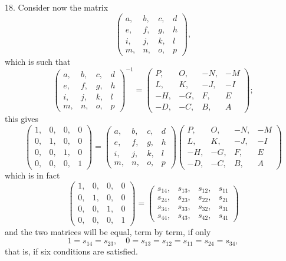 \documentclass[11pt,a4paper]{article}
\theoremstyle{plain}
\begin{document}
18. Consider now the matrix
\[
\begin{pmatrix}
a, & b, & c, & d \\
e, & f, & g, & h \\
i, & j, & k, & l \\
m, & n, & o, & p
\end{pmatrix},
\]
which is such that
\[
\begin{pmatrix}
a, & b, & c, & d \\
e, & f, & g, & h \\
i, & j, & k, & l \\
m, & n, & o, & p
\end{pmatrix}^{-1}
=
\begin{pmatrix}
P, & O, & -N, & -M \\
L, & K, & -J, & -I \\
-H, & -G, & F, & E \\
-D, & -C, & B, & A
\end{pmatrix};
\]
this gives
\[
\begin{pmatrix}
1, & 0, & 0, & 0 \\
0, & 1, & 0, & 0 \\
0, & 0, & 1, & 0 \\
0, & 0, & 0, & 1
\end{pmatrix}
=
\begin{pmatrix}
a, & b, & c, & d \\
e, & f, & g, & h \\
i, & j, & k, & l \\
m, & n, & o, & p
\end{pmatrix}
\begin{pmatrix}
P, & O, & -N, & -M \\
L, & K, & -J, & -I \\
-H, & -G, & F, & E \\
-D, & -C, & B, & A
\end{pmatrix}
\]
which is in fact
\[
\begin{pmatrix}
1, & 0, & 0, & 0 \\
0, & 1, & 0, & 0 \\
0, & 0, & 1, & 0 \\
0, & 0, & 0, & 1
\end{pmatrix}
=
\begin{pmatrix}
s_{14}, & s_{13}, & s_{12}, & s_{11} \\
s_{24}, & s_{23}, & s_{22}, & s_{21} \\
s_{34}, & s_{33}, & s_{32}, & s_{31} \\
s_{44}, & s_{43}, & s_{42}, & s_{41}
\end{pmatrix}
\]
and the two matrices will be equal, term by term, if only
\[
1 = s_{14} = s_{23}, \quad 0 = s_{13} = s_{12} = s_{11} = s_{24} = s_{34},
\]
that is, if six conditions are satisfied.
\end{document}
